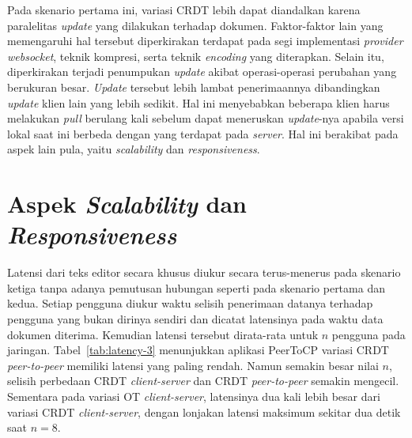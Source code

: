 Pada skenario pertama ini, variasi CRDT lebih dapat diandalkan karena paralelitas \textit{update} yang dilakukan terhadap dokumen. Faktor-faktor lain yang memengaruhi hal tersebut diperkirakan terdapat pada segi implementasi \textit{provider websocket}, teknik kompresi, serta teknik \textit{encoding} yang diterapkan. Selain itu, diperkirakan terjadi  penumpukan \textit{update} akibat operasi-operasi perubahan yang berukuran besar. \textit{Update} tersebut lebih lambat penerimaannya dibandingkan \textit{update} klien lain yang lebih sedikit. Hal ini menyebabkan beberapa klien harus melakukan \textit{pull} berulang kali sebelum dapat meneruskan \textit{update}-nya apabila versi lokal saat ini berbeda dengan yang terdapat pada \textit{server}. Hal ini berakibat pada aspek lain pula, yaitu \textit{scalability} dan \textit{responsiveness}.

\section{Aspek \textit{Scalability} dan \textit{Responsiveness}}

Latensi dari teks editor secara khusus diukur secara terus-menerus pada skenario ketiga tanpa adanya pemutusan hubungan seperti pada skenario pertama dan kedua. Setiap pengguna diukur waktu selisih penerimaan datanya terhadap pengguna yang bukan dirinya sendiri dan dicatat latensinya pada waktu data dokumen diterima. Kemudian latensi tersebut dirata-rata untuk $n$ pengguna pada jaringan. Tabel~\ref{tab:latency-3} menunjukkan aplikasi PeerToCP variasi CRDT \textit{peer-to-peer} memiliki latensi yang paling rendah. Namun semakin besar nilai $n$, selisih perbedaan CRDT \textit{client-server} dan CRDT \textit{peer-to-peer} semakin mengecil. Sementara pada variasi OT \textit{client-server}, latensinya dua kali lebih besar dari variasi CRDT \textit{client-server}, dengan lonjakan latensi maksimum sekitar dua detik saat $n = 8$.

